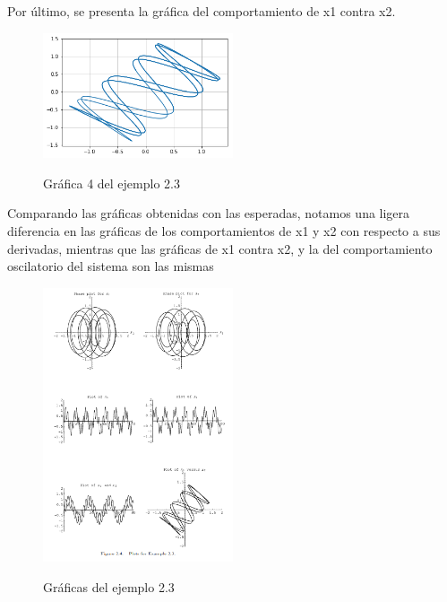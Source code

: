 \documentclass{article}
\begin{document}
Por último, se presenta la gráfica del comportamiento de x1 contra x2.
\begin{figure}[H]
    \caption{Gráfica 4 del ejemplo 2.3}
    \includegraphics[width=0.5\textwidth]{Grafica9.png}
    \centering
    \label{Cod}
\end{figure}
Comparando las gráficas obtenidas con las esperadas, notamos una ligera diferencia en las gráficas de los comportamientos de x1 y x2 con respecto a sus derivadas, mientras que las gráficas de x1 contra x2, y la del comportamiento oscilatorio del sistema son las mismas
\begin{figure}[H]
    \caption{Gráficas del ejemplo 2.3}
    \includegraphics[width=0.5\textwidth]{Ejemplo3.PNG}
    \centering
    \label{Cod}
\end{figure}
\end{document}
